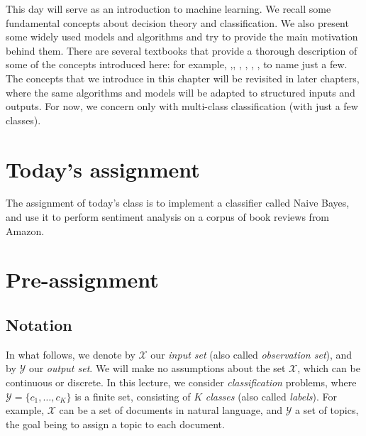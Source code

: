 
This day will serve as an introduction to machine learning. We recall some fundamental concepts 
about decision theory and classification. We also present some widely used models and algorithms 
and try to provide the main motivation behind them. 
There are several textbooks that provide a thorough description of some of the concepts introduced here: 
for example, \citet{Mitchell1997},\citet{Duda2001}, \citet{Schoelkopf2002}, \citet{Joachims2002}, \citet{Bishop2006}, \citet{Manning2008}, 
to name just a few.  
The concepts that we introduce in this chapter will be revisited in later chapters, where the same algorithms and models 
will be adapted to structured inputs and outputs. For now, we concern only with multi-class classification 
(with just a few classes). 

\section*{Today's assignment}

The assignment of today's class is to implement a classifier called Naive Bayes, and use it to perform sentiment analysis on a corpus of book reviews from Amazon.

\section{Pre-assignment}

\subsection{Notation}

In what follows, we denote by $\mathcal{X}$ our \emph{input set} (also called \emph{observation set}), and by $\mathcal{Y}$ our \emph{output set}. 
We will make no assumptions about the set $\mathcal{X}$, which can be continuous or discrete. In this lecture, we 
consider \emph{classification} problems, where $\mathcal{Y} = \{c_1,\ldots,c_K\}$ is a finite set, consisting of $K$ \emph{classes} (also called \emph{labels}). 
For example, $\mathcal{X}$ can be a set of documents in natural language, and $\mathcal{Y}$ a set of topics, the goal 
being to assign a topic to each document. 

